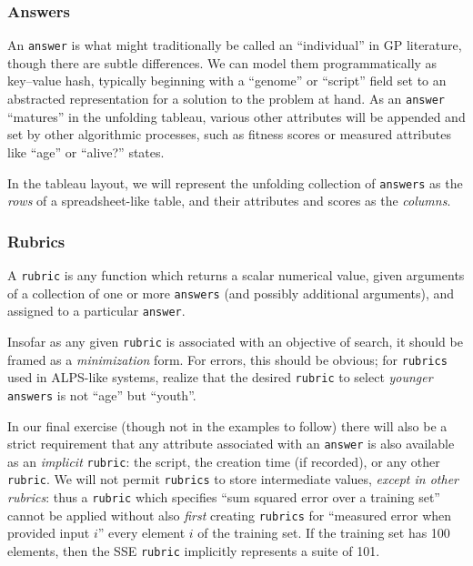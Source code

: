 \subsubsection{Answers}\hypertarget{answers}{}\label{answers}

An {\tt answer} is what might traditionally be called an ``individual'' in GP literature, though there are subtle differences. We can model them programmatically as key--value hash, typically beginning with a ``genome'' or ``script'' field set to an abstracted representation for a solution to the problem at hand. As an {\tt answer} ``matures'' in the unfolding tableau, various  other attributes will be appended and set by other algorithmic processes, such as fitness scores or measured attributes like ``age'' or ``alive?'' states.

In the tableau layout, we will represent the unfolding collection of {\tt answers} as the \emph{rows} of a spreadsheet-like table, and their attributes and scores as the \emph{columns}.

\subsubsection{Rubrics}\hypertarget{rubrics}{}\label{rubrics}

A {\tt rubric} is any function which returns a scalar numerical value, given arguments of a collection of one or more {\tt answers} (and possibly additional arguments), and assigned to a particular {\tt answer}.

Insofar as any given {\tt rubric} is associated with an objective of search, it should be framed as a \emph{minimization} form. For errors, this should be obvious; for {\tt rubrics} used in ALPS-like systems, realize that the desired {\tt rubric} to select \emph{younger} {\tt answers} is not ``age'' but ``youth''.

In our final exercise (though not in the examples to follow) there will also be a strict requirement that any attribute associated with an {\tt answer} is also available as an \emph{implicit} {\tt rubric}: the script, the creation time (if recorded), or any other {\tt rubric}. We will not permit {\tt rubrics} to store intermediate values, \emph{except in other rubrics}: thus a {\tt rubric} which specifies ``sum squared error over a training set'' cannot be applied without also \emph{first} creating {\tt rubrics} for ``measured error when provided input $i$'' every element $i$ of the training set. If the training set has 100 elements, then the SSE {\tt rubric} implicitly represents a suite of 101.

